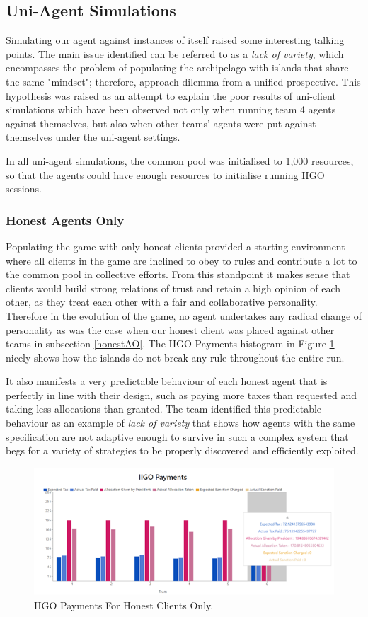 \subsection{Uni-Agent Simulations} \label{againstself}
Simulating our agent against instances of itself raised some interesting talking points. The main issue identified can be referred to as a \emph{lack of variety}, which encompasses the problem of populating the archipelago with islands that share the same "mindset"; therefore, approach dilemma from a unified prospective. This hypothesis was raised as an attempt to explain the poor results of uni-client simulations which have been observed not only when running team 4 agents against themselves, but also when other teams' agents were put against themselves under the uni-agent settings.

In all uni-agent simulations, the common pool was initialised to 1,000 resources, so that the agents could have enough resources to initialise running IIGO sessions.

\subsubsection{Honest Agents Only}
Populating the game with only honest clients provided a starting environment where all clients in the game are inclined to obey to rules and contribute a lot to the common pool in collective efforts. From this standpoint it makes sense that clients would build strong relations of trust and retain a high opinion of each other, as they treat each other with a fair and collaborative personality. Therefore in the evolution of the game, no agent undertakes any radical change of personality as was the case when our honest client was placed against other teams in subsection \ref{honestAO}. The IIGO Payments histogram in Figure \ref{fig:IIGOHH} nicely shows how the islands do not break any rule throughout the entire run.

It also manifests a very predictable behaviour of each honest agent that is perfectly in line with their design, such as paying more taxes than requested and taking less allocations than granted. The team identified this predictable behaviour as an example of \emph{lack of variety} that shows how agents with the same specification are not adaptive enough to survive in such a complex system that begs for a variety of strategies to be properly discovered and efficiently exploited.

\begin{figure}[H]
\centering
\includegraphics[scale=0.8]{12_team4_agentdesign/images/IIGOHH.png}
\caption{IIGO Payments For Honest Clients Only.}
\label{fig:IIGOHH}
\end{figure}

